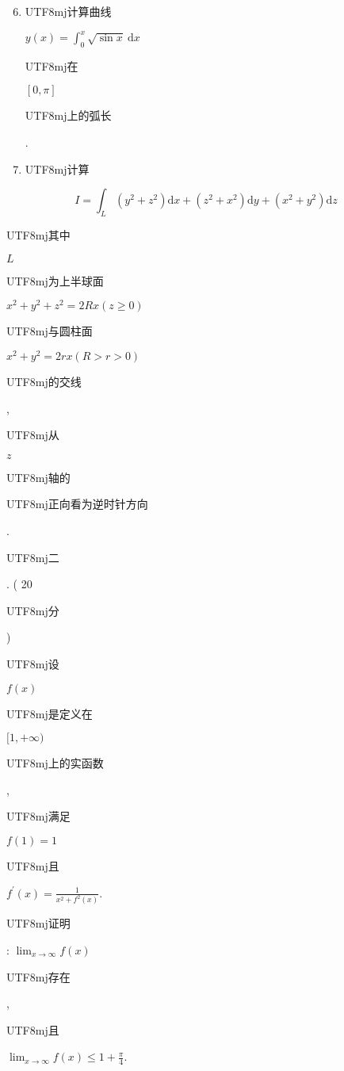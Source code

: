 \documentclass[10pt]{article}
\begin{document}
\begin{enumerate}
  \setcounter{enumi}{5}
  \item \begin{CJK}{UTF8}{mj}计算曲线\end{CJK} $y(x)=\int_{0}^{x} \sqrt{\sin x} \mathrm{~d} x$ \begin{CJK}{UTF8}{mj}在\end{CJK} $[0, \pi]$ \begin{CJK}{UTF8}{mj}上的弧长\end{CJK}.

  \item \begin{CJK}{UTF8}{mj}计算\end{CJK}

\end{enumerate}
$$
I=\int_{L}\left(y^{2}+z^{2}\right) \mathrm{d} x+\left(z^{2}+x^{2}\right) \mathrm{d} y+\left(x^{2}+y^{2}\right) \mathrm{d} z
$$
\begin{CJK}{UTF8}{mj}其中\end{CJK} $L$ \begin{CJK}{UTF8}{mj}为上半球面\end{CJK} $x^{2}+y^{2}+z^{2}=2 R x(z \geqslant 0)$ \begin{CJK}{UTF8}{mj}与圆柱面\end{CJK} $x^{2}+y^{2}=2 r x(R>r>0)$ \begin{CJK}{UTF8}{mj}的交线\end{CJK}, \begin{CJK}{UTF8}{mj}从\end{CJK} $z$ \begin{CJK}{UTF8}{mj}轴的\end{CJK} \begin{CJK}{UTF8}{mj}正向看为逆时针方向\end{CJK}.

\begin{CJK}{UTF8}{mj}二\end{CJK}. ( 20 \begin{CJK}{UTF8}{mj}分\end{CJK}) \begin{CJK}{UTF8}{mj}设\end{CJK} $f(x)$ \begin{CJK}{UTF8}{mj}是定义在\end{CJK} $[1,+\infty)$ \begin{CJK}{UTF8}{mj}上的实函数\end{CJK}, \begin{CJK}{UTF8}{mj}满足\end{CJK} $f(1)=1$ \begin{CJK}{UTF8}{mj}且\end{CJK} $f^{\prime}(x)=\frac{1}{x^{2}+f^{2}(x)}$. \begin{CJK}{UTF8}{mj}证明\end{CJK}: $\lim _{x \rightarrow \infty} f(x)$ \begin{CJK}{UTF8}{mj}存在\end{CJK}, \begin{CJK}{UTF8}{mj}且\end{CJK} $\lim _{x \rightarrow \infty} f(x) \leqslant 1+\frac{\pi}{4}$.
\end{document}
